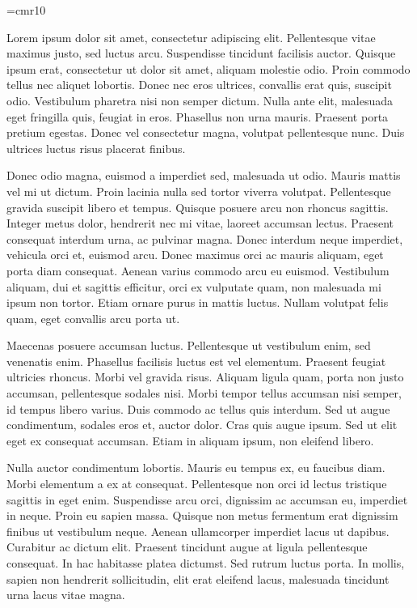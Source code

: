 \font\thefont=cmr10 \thefont

Lorem ipsum dolor sit amet, consectetur adipiscing elit. Pellentesque vitae maximus justo, sed luctus arcu. Suspendisse tincidunt facilisis auctor. Quisque ipsum erat, consectetur ut dolor sit amet, aliquam molestie odio. Proin commodo tellus nec aliquet lobortis. Donec nec eros ultrices, convallis erat quis, suscipit odio. Vestibulum pharetra nisi non semper dictum. Nulla ante elit, malesuada eget fringilla quis, feugiat in eros. Phasellus non urna mauris. Praesent porta pretium egestas. Donec vel consectetur magna, volutpat pellentesque nunc. Duis ultrices luctus risus placerat finibus.

Donec odio magna, euismod a imperdiet sed, malesuada ut odio. Mauris mattis vel mi ut dictum. Proin lacinia nulla sed tortor viverra volutpat. Pellentesque gravida suscipit libero et tempus. Quisque posuere arcu non rhoncus sagittis. Integer metus dolor, hendrerit nec mi vitae, laoreet accumsan lectus. Praesent consequat interdum urna, ac pulvinar magna. Donec interdum neque imperdiet, vehicula orci et, euismod arcu. Donec maximus orci ac mauris aliquam, eget porta diam consequat. Aenean varius commodo arcu eu euismod. Vestibulum aliquam, dui et sagittis efficitur, orci ex vulputate quam, non malesuada mi ipsum non tortor. Etiam ornare purus in mattis luctus. Nullam volutpat felis quam, eget convallis arcu porta ut.

Maecenas posuere accumsan luctus. Pellentesque ut vestibulum enim, sed venenatis enim. Phasellus facilisis luctus est vel elementum. Praesent feugiat ultricies rhoncus. Morbi vel gravida risus. Aliquam ligula quam, porta non justo accumsan, pellentesque sodales nisi. Morbi tempor tellus accumsan nisi semper, id tempus libero varius. Duis commodo ac tellus quis interdum. Sed ut augue condimentum, sodales eros et, auctor dolor. Cras quis augue ipsum. Sed ut elit eget ex consequat accumsan. Etiam in aliquam ipsum, non eleifend libero.

Nulla auctor condimentum lobortis. Mauris eu tempus ex, eu faucibus diam. Morbi elementum a ex at consequat. Pellentesque non orci id lectus tristique sagittis in eget enim. Suspendisse arcu orci, dignissim ac accumsan eu, imperdiet in neque. Proin eu sapien massa. Quisque non metus fermentum erat dignissim finibus ut vestibulum neque. Aenean ullamcorper imperdiet lacus ut dapibus. Curabitur ac dictum elit. Praesent tincidunt augue at ligula pellentesque consequat. In hac habitasse platea dictumst. Sed rutrum luctus porta. In mollis, sapien non hendrerit sollicitudin, elit erat eleifend lacus, malesuada tincidunt urna lacus vitae magna.

